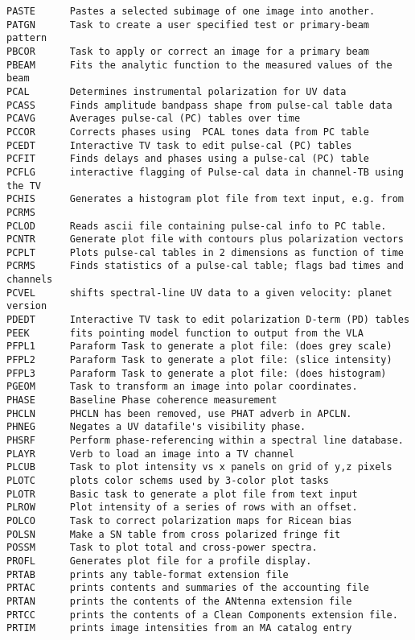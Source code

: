 \begin{verbatim}
PASTE      Pastes a selected subimage of one image into another.
PATGN      Task to create a user specified test or primary-beam pattern
PBCOR      Task to apply or correct an image for a primary beam
PBEAM      Fits the analytic function to the measured values of the beam
PCAL       Determines instrumental polarization for UV data
PCASS      Finds amplitude bandpass shape from pulse-cal table data
PCAVG      Averages pulse-cal (PC) tables over time
PCCOR      Corrects phases using  PCAL tones data from PC table
PCEDT      Interactive TV task to edit pulse-cal (PC) tables
PCFIT      Finds delays and phases using a pulse-cal (PC) table
PCFLG      interactive flagging of Pulse-cal data in channel-TB using the TV
PCHIS      Generates a histogram plot file from text input, e.g. from PCRMS
PCLOD      Reads ascii file containing pulse-cal info to PC table.
PCNTR      Generate plot file with contours plus polarization vectors
PCPLT      Plots pulse-cal tables in 2 dimensions as function of time
PCRMS      Finds statistics of a pulse-cal table; flags bad times and channels
PCVEL      shifts spectral-line UV data to a given velocity: planet version
PDEDT      Interactive TV task to edit polarization D-term (PD) tables
PEEK       fits pointing model function to output from the VLA
PFPL1      Paraform Task to generate a plot file: (does grey scale)
PFPL2      Paraform Task to generate a plot file: (slice intensity)
PFPL3      Paraform Task to generate a plot file: (does histogram)
PGEOM      Task to transform an image into polar coordinates.
PHASE      Baseline Phase coherence measurement
PHCLN      PHCLN has been removed, use PHAT adverb in APCLN.
PHNEG      Negates a UV datafile's visibility phase.
PHSRF      Perform phase-referencing within a spectral line database.
PLAYR      Verb to load an image into a TV channel
PLCUB      Task to plot intensity vs x panels on grid of y,z pixels
PLOTC      plots color schems used by 3-color plot tasks
PLOTR      Basic task to generate a plot file from text input
PLROW      Plot intensity of a series of rows with an offset.
POLCO      Task to correct polarization maps for Ricean bias
POLSN      Make a SN table from cross polarized fringe fit
POSSM      Task to plot total and cross-power spectra.
PROFL      Generates plot file for a profile display.
PRTAB      prints any table-format extension file
PRTAC      prints contents and summaries of the accounting file
PRTAN      prints the contents of the ANtenna extension file
PRTCC      prints the contents of a Clean Components extension file.
PRTIM      prints image intensities from an MA catalog entry

\end{verbatim}
